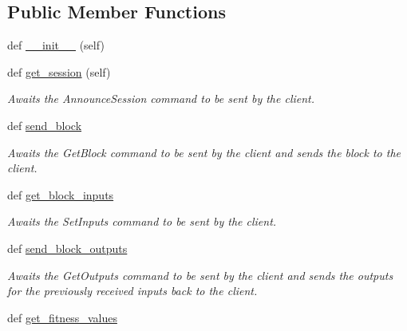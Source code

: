 \subsection*{Public Member Functions}
\begin{DoxyCompactItemize}
\item 
def \hyperlink{classNEAT__PyGenetics_1_1NEAT_1_1Networking_1_1Server_1_1SimulationConnector_1_1SimulationConnector_a3efe4fc8a7d68cfd454fbaf0e981bee5}{\+\_\+\+\_\+init\+\_\+\+\_\+} (self)
\item 
def \hyperlink{classNEAT__PyGenetics_1_1NEAT_1_1Networking_1_1Server_1_1SimulationConnector_1_1SimulationConnector_af5849c17a1aa5ef6bc4f9e1f798fe00c}{get\+\_\+session} (self)
\begin{DoxyCompactList}\small\item\em Awaits the Announce\+Session command to be sent by the client. \end{DoxyCompactList}\item 
def \hyperlink{classNEAT__PyGenetics_1_1NEAT_1_1Networking_1_1Server_1_1SimulationConnector_1_1SimulationConnector_a4984c0604704e1808a51050274c7a56e}{send\+\_\+block}
\begin{DoxyCompactList}\small\item\em Awaits the Get\+Block command to be sent by the client and sends the block to the client. \end{DoxyCompactList}\item 
def \hyperlink{classNEAT__PyGenetics_1_1NEAT_1_1Networking_1_1Server_1_1SimulationConnector_1_1SimulationConnector_a193505d0bf3a8dfa0063b7aca22cd84b}{get\+\_\+block\+\_\+inputs}
\begin{DoxyCompactList}\small\item\em Awaits the Set\+Inputs command to be sent by the client. \end{DoxyCompactList}\item 
def \hyperlink{classNEAT__PyGenetics_1_1NEAT_1_1Networking_1_1Server_1_1SimulationConnector_1_1SimulationConnector_a82d0ed025654632c25d2241aef9024cc}{send\+\_\+block\+\_\+outputs}
\begin{DoxyCompactList}\small\item\em Awaits the Get\+Outputs command to be sent by the client and sends the outputs for the previously received inputs back to the client. \end{DoxyCompactList}\item 
def \hyperlink{classNEAT__PyGenetics_1_1NEAT_1_1Networking_1_1Server_1_1SimulationConnector_1_1SimulationConnector_af63e36b9eb1e3dcc9d58e437d251cc35}{get\+\_\+fitness\+\_\+values}

\end{DoxyCompactItemize}
